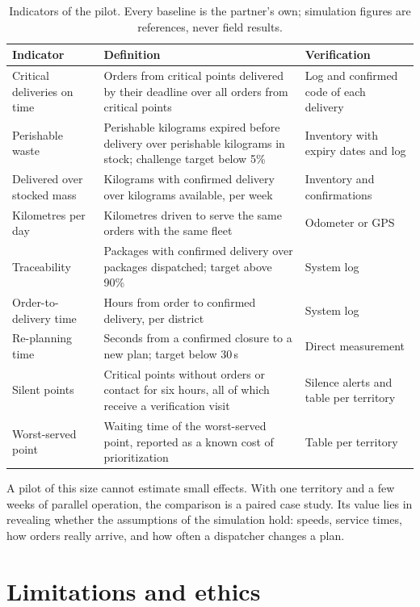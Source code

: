 \documentclass[11pt]{article}
\begin{document}
\begin{table}[ht]
\centering
\small
\caption{Indicators of the pilot. Every baseline is the partner's own; simulation figures are references, never field results.}
\label{tab:indicators}
\begin{tabularx}{\linewidth}{L{3.6cm} Y L{3.4cm}}
\toprule
Indicator & Definition & Verification \\
\midrule
Critical deliveries on time & Orders from critical points delivered by their deadline over all orders from critical points & Log and confirmed code of each delivery \\
Perishable waste & Perishable kilograms expired before delivery over perishable kilograms in stock; challenge target below 5\% & Inventory with expiry dates and log \\
Delivered over stocked mass & Kilograms with confirmed delivery over kilograms available, per week & Inventory and confirmations \\
Kilometres per day & Kilometres driven to serve the same orders with the same fleet & Odometer or GPS \\
Traceability & Packages with confirmed delivery over packages dispatched; target above 90\% & System log \\
Order-to-delivery time & Hours from order to confirmed delivery, per district & System log \\
Re-planning time & Seconds from a confirmed closure to a new plan; target below 30\,s & Direct measurement \\
Silent points & Critical points without orders or contact for six hours, all of which receive a verification visit & Silence alerts and table per territory \\
Worst-served point & Waiting time of the worst-served point, reported as a known cost of prioritization & Table per territory \\
\bottomrule
\end{tabularx}
\end{table}

A pilot of this size cannot estimate small effects. With one territory and a few weeks of parallel operation, the comparison is a paired case study. Its value lies in revealing whether the assumptions of the simulation hold: speeds, service times, how orders really arrive, and how often a dispatcher changes a plan.

\section{Limitations and ethics}\label{sec:limits}
\end{document}
